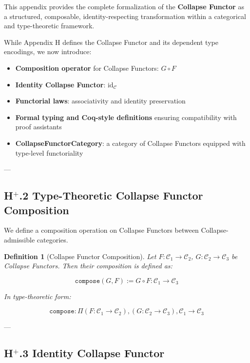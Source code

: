 \documentclass[11pt]{article}
\newtheorem{definition}[theorem]{Definition}
\begin{document}
This appendix provides the complete formalization of the \textbf{Collapse Functor} as a structured, composable, identity-respecting transformation within a categorical and type-theoretic framework.

While Appendix H defines the Collapse Functor and its dependent type encodings, we now introduce:

\begin{itemize}
  \item \textbf{Composition operator} for Collapse Functors: $G \circ F$
  \item \textbf{Identity Collapse Functor}: $\mathrm{id}_{\mathcal{C}}$
  \item \textbf{Functorial laws}: associativity and identity preservation
  \item \textbf{Formal typing and Coq-style definitions} ensuring compatibility with proof assistants
  \item \textbf{CollapseFunctorCategory}: a category of Collapse Functors equipped with type-level functoriality
\end{itemize}

---

\subsection*{H$^{+}$.2 Type-Theoretic Collapse Functor Composition}

We define a composition operation on Collapse Functors between Collapse-admissible categories.

\begin{definition}[Collapse Functor Composition]
Let $F : \mathcal{C}_1 \to \mathcal{C}_2$, $G : \mathcal{C}_2 \to \mathcal{C}_3$ be Collapse Functors.  
Then their composition is defined as:

\[
\texttt{compose}(G, F) := G \circ F : \mathcal{C}_1 \to \mathcal{C}_3
\]

In type-theoretic form:

\[
\texttt{compose} : \Pi (F : \mathcal{C}_1 \to \mathcal{C}_2), (G : \mathcal{C}_2 \to \mathcal{C}_3), \mathcal{C}_1 \to \mathcal{C}_3
\]
\end{definition}

---

\subsection*{H$^{+}$.3 Identity Collapse Functor}
\end{document}
